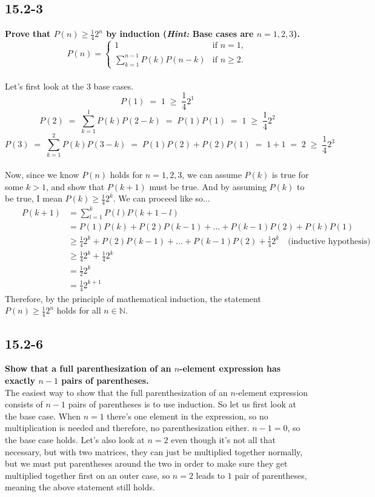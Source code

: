 \documentclass[11pt]{article}
\begin{document}
 \subsection*{15.2-3}
 \textbf{Prove that $P(n) \geq \frac{1}{4}2^n$ by induction (\textit{Hint:} Base cases are 
 $n=1,2,3$).}
 \[
   P(n) = 
   \begin{cases}
     1 & \text{if } n = 1, \\
     \displaystyle\sum_{k=1}^{n-1} P(k)P(n-k) & \text{if } n \geq 2.
   \end{cases}
 \] \\

 Let's first look at the 3 base cases. 
$$P(1) \;=\; 1 \;\geq\; \frac{1}{4}2^1$$
$$P(2) \;=\; \displaystyle\sum_{k=1}^{1}P(k)P(2-k) \;=\; P(1)P(1) \;=\; 1 \;\geq\; 
\frac{1}{4}2^2$$
$$P(3) \;=\; \displaystyle\sum_{k=1}^{2}P(k)P(3-k) \;=\; P(1)P(2) + P(2)P(1) \;=\; 
1 + 1 \;=\; 2 \;\geq\; \frac{1}{4}2^3$$ \\

Now, since we know $P(n)$ holds for $n=1,2,3$, we can assume $P(k)$ is true for some $k > 1$, and 
show that $P(k+1)$ must be true.  And by assuming $P(k)$ to be true, I mean 
$P(k) \geq \frac{1}{4}2^k$.  We can proceed like so...
\begin{align*}
  && P(k+1) &= \displaystyle\sum_{l=1}^{k}P(l)P(k+1-l) && \\
  && &= P(1)P(k) + P(2)P(k-1) + \dots + P(k-1)P(2) + P(k)P(1) && \\
  && &\geq \frac{1}{4}2^k + P(2)P(k-1) + \dots + P(k-1)P(2) + \frac{1}{4}2^k \quad
  \text{(inductive hypothesis)} && \\
  && &\geq \frac{1}{4}2^k + \frac{1}{4}2^k && \\
  && &= \frac{1}{2}2^k && \\
  && &= \frac{1}{4}2^{k+1} &&
\end{align*}
Therefore, by the principle of mathematical induction, the statement $P(n) \geq \frac{1}{4}2^n$ 
holds for all $n \in \mathbb{N}$.
 \newpage

 \subsection*{15.2-6}
 \textbf{Show that a full parenthesization of an $n$-element expression has exactly $n-1$ pairs 
 of parentheses.} \\

 The easiest way to show that the full parenthesization of an $n$-element expression consists of 
 $n-1$ pairs of parentheses is to use induction.  So let us first look at the base case.  When 
 $n=1$ there's one element in the expression, so no multiplication is needed and therefore, no 
 parenthesization either. $n-1=0$, so the base case holds.  Let's also look at $n=2$ even though 
 it's not all that necessary, but with two matrices, they can just be multiplied together 
 normally, but we must put parentheses around the two in order to make sure they get multiplied 
 together first on an outer case, so $n=2$ leads to $1$ pair of parentheses, meaning the above 
 statement still holds. \\
\end{document}
